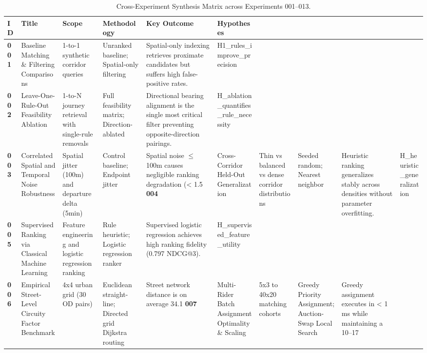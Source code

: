 \begin{table}[t]
\centering
\small
\caption{Cross-Experiment Synthesis Matrix across Experiments 001--013.}
\label{tab:synthesis_matrix}
\begin{tabularx}{\textwidth}{l p{3.2cm} p{3.0cm} p{3.5cm} p{3.5cm} l}
\toprule
\textbf{ID} & \textbf{Title} & \textbf{Scope} & \textbf{Methodology} & \textbf{Key Outcome} & \textbf{Hypotheses} \\
\midrule
\textbf{001} & Baseline Matching \& Filtering Comparisons & 1-to-1 synthetic corridor queries & Unranked baseline; Spatial-only filtering & Spatial-only indexing retrieves proximate candidates but suffers high false-positive rates. & H1\_rules\_improve\_precision \\
\textbf{002} & Leave-One-Rule-Out Feasibility Ablation & 1-to-N journey retrieval with single-rule removals & Full feasibility matrix; Direction-ablated & Directional bearing alignment is the single most critical filter preventing opposite-direction pairings. & H\_ablation\_quantifies\_rule\_necessity \\
\textbf{003} & Correlated Spatial and Temporal Noise Robustness & Spatial jitter (100m) and departure delta (5min) & Control baseline; Endpoint jitter & Spatial noise $\le$ 100m causes negligible ranking degradation (< 1.5%
\textbf{004} & Cross-Corridor Held-Out Generalization & Thin vs balanced vs dense corridor distributions & Seeded random; Nearest neighbor & Heuristic ranking generalizes stably across densities without parameter overfitting. & H\_heuristic\_generalization \\
\textbf{005} & Supervised Ranking via Classical Machine Learning & Feature engineering and logistic regression ranking & Rule heuristic; Logistic regression ranker & Supervised logistic regression achieves high ranking fidelity (0.797 NDCG@3). & H\_supervised\_feature\_utility \\
\textbf{006} & Empirical Street-Level Circuity Factor Benchmark & 4x4 urban grid (30 OD pairs) & Euclidean straight-line; Directed grid Dijkstra routing & Street network distance is on average 34.1%
\textbf{007} & Multi-Rider Batch Assignment Optimality \& Scaling & 5x3 to 40x20 matching cohorts & Greedy Priority Assignment; Auction-Swap Local Search & Greedy assignment executes in < 1 ms while maintaining a 10–17%

\end{tabularx}
\end{table}
